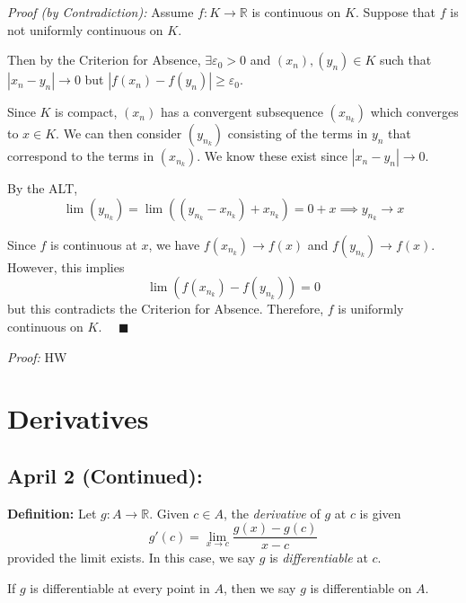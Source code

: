 \documentclass[12pt]{report}
\newcommand{\R}{\mathbb{R}}
\newcommand{\qed}{\quad \blacksquare}
\newcommand{\abs}[1]{\left\vert #1 \right\vert}
\newcommand{\ep}{\varepsilon}
\newenvironment*{tbox}[2][gray]{
    \begin{tcolorbox}[
        parbox=false,
        colback=#1!5!white,
        colframe=#1!75!black,
        breakable,
        title={#2}
    ]}
    {\end{tcolorbox}}
\begin{document}
    \begin{tbox}{\textbf{Theorem (Uniform Continuity on Compact Sets):} A function that is continuous on a compact set $K$ is uniformly continuous on $K$.}
        \emph{Proof (by Contradiction):} Assume $f: K \to \R$ is continuous on $K$. Suppose that $f$ is not uniformly continuous on $K$. 
        
        Then by the Criterion for Absence, $\exists \ep_0 > 0$ and $(x_n), (y_n) \in K$ such that $\abs{x_n - y_n} \to 0$ but $\abs{f(x_n) - f(y_n)} \geq \ep_0$.

        Since $K$ is compact, $(x_n)$ has a convergent subsequence $(x_{n_k})$ which converges to $x \in K$. We can then consider $(y_{n_k})$ consisting of the terms in $y_n$ that correspond to the terms in $(x_{n_k})$. We know these exist since $\abs{x_n - y_n} \to 0$.

        By the ALT, 
        \[\lim(y_{n_k}) = \lim((y_{n_k} - x_{n_k}) + x_{n_k}) = 0 + x \implies y_{n_k} \to x\]

        Since $f$ is continuous at $x$, we have $f(x_{n_k}) \to f(x)$ and $f(y_{n_k}) \to f(x)$. However, this implies 
        \[\lim (f(x_{n_k}) - f(y_{n_k})) = 0\] 
        but this contradicts the Criterion for Absence. Therefore, $f$ is uniformly continuous on $K$. $\qed$
    \end{tbox}

    \begin{tbox}{\textbf{Intermediate Value Theorem:} Let $f: [a, b] \to \R$ be continuous. If $L$ is a real number satisfying $f(a) < L < f(b)$ or $f(a) > L > f(b)$, then $\exists c \in (a, b)$ such that $f(c) = L$.}
        \emph{Proof:} HW
    \end{tbox}

\chapter{Derivatives}
\section*{April 2 (Continued):}

    \textbf{Definition:} Let $g: A \to \R$. Given $c \in A$, the \emph{derivative} of $g$ at $c$ is given 
    \[g'(c) = \lim_{x \to c} \frac{g(x) - g(c)}{x - c}\]
    provided the limit exists. In this case, we say $g$ is \emph{differentiable} at $c$.

    If $g$ is differentiable at every point in $A$, then we say $g$ is differentiable on $A$.
\end{document}
